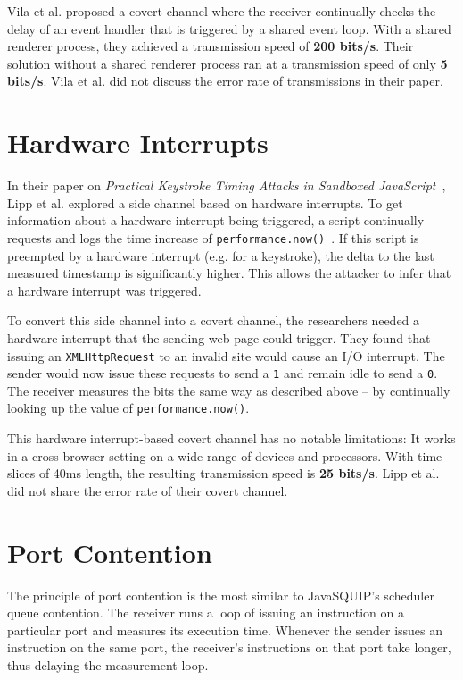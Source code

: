 \documentclass[11pt,
  titlepage=false,
  parskip=half,      %
]{scrreprt}
\begin{document}
Vila et al. proposed a covert channel where the receiver continually checks the delay of an event handler
that is triggered by a shared event loop.
With a shared renderer process, they achieved a transmission speed of \textbf{200 bits/s}.
Their solution without a shared renderer process ran at a transmission speed of only \textbf{5 bits/s}.
Vila et al. did not discuss the error rate of transmissions in their paper.

\section{Hardware Interrupts}
In their paper on \textit{Practical Keystroke Timing Attacks in Sandboxed JavaScript}~\cite{lipp2017practical},
Lipp et al. explored a side channel based on hardware interrupts.
To get information about a hardware interrupt being triggered,
a script continually requests and logs the time increase of \texttt{performance.now()}~\cite{performancenow}.
If this script is preempted by a hardware interrupt (e.g. for a keystroke),
the delta to the last measured timestamp is significantly higher.
This allows the attacker to infer that a hardware interrupt was triggered.

To convert this side channel into a covert channel,
the researchers needed a hardware interrupt that the sending web page could trigger.
They found that issuing an \texttt{XMLHttpRequest} to an invalid site would cause an I/O interrupt.
The sender would now issue these requests to send a \texttt{1} and remain idle to send a \texttt{0}.
The receiver measures the bits the same way as described above --
by continually looking up the value of \texttt{performance.now()}.

This hardware interrupt-based covert channel has no notable limitations:
It works in a cross-browser setting on a wide range of devices and processors.
With time slices of 40ms length, the resulting transmission speed is \textbf{25 bits/s}.
Lipp et al. did not share the error rate of their covert channel.

\section{Port Contention}
The principle of port contention is the most similar to JavaSQUIP's scheduler queue contention.
The receiver runs a loop of issuing an instruction on a particular port and measures its execution time.
Whenever the sender issues an instruction on the same port, the receiver's instructions on that port take longer,
thus delaying the measurement loop.
\end{document}

